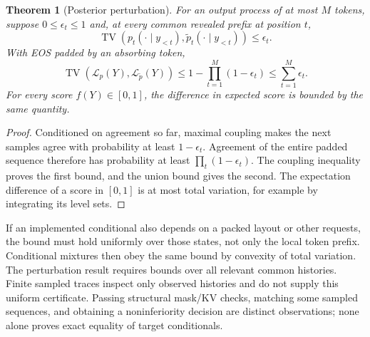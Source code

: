 \documentclass{article}
\newtheorem{theorem}{Theorem}
\begin{document}
\begin{theorem}[Posterior perturbation]
\label{thm:posterior-perturbation}
For an output process of at most $M$ tokens, suppose $0\le\epsilon_t\le1$ and, at every common revealed prefix at position $t$,
\[
\operatorname{TV}(p_t(\cdot\mid y_{<t}),\widetilde p_t(\cdot\mid y_{<t}))\le\epsilon_t.
\]
With EOS padded by an absorbing token,
\begin{equation}
\operatorname{TV}(\mathcal L_p(Y),\mathcal L_{\widetilde p}(Y))
\le1-\prod_{t=1}^M(1-\epsilon_t)
\le\sum_{t=1}^M\epsilon_t.
\label{eq:law-bound}
\end{equation}
For every score $f(Y)\in[0,1]$, the difference in expected score is bounded by the same quantity.
\end{theorem}
\begin{proof}
Conditioned on agreement so far, maximal coupling makes the next samples agree with probability at least $1-\epsilon_t$. Agreement of the entire padded sequence therefore has probability at least $\prod_t(1-\epsilon_t)$. The coupling inequality proves the first bound, and the union bound gives the second. The expectation difference of a score in $[0,1]$ is at most total variation, for example by integrating its level sets.
\end{proof}

If an implemented conditional also depends on a packed layout or other requests, the bound must hold uniformly over those states, not only the local token prefix. Conditional mixtures then obey the same bound by convexity of total variation. The perturbation result requires bounds over all relevant common histories. Finite sampled traces inspect only observed histories and do not supply this uniform certificate. Passing structural mask/KV checks, matching some sampled sequences, and obtaining a noninferiority decision are distinct observations; none alone proves exact equality of target conditionals.
\end{document}
